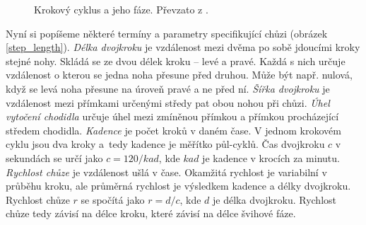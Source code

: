\begin{figure}[h]
\begin{center}
\caption{Krokový cyklus a jeho fáze. Převzato z \cite{gait_img}.} \label{gait_cycle}
\end{center}
\end{figure}

Nyní si popíšeme některé termíny a parametry specifikující chůzi (obrázek \ref{step_length}). \textit{Délka dvojkroku} je vzdálenost mezi dvěma po sobě jdoucími kroky stejné nohy. Skládá se ze dvou délek kroku -- levé a pravé. Každá s nich určuje vzdálenost o kterou se jedna noha přesune před druhou. Může být např. nulová, když se levá noha přesune na úroveň pravé a ne před ní. \textit{Šířka dvojkroku} je vzdálenost mezi přímkami určenými středy pat obou nohou při chůzi. \textit{Úhel vytočení chodidla} určuje úhel mezi zmíněnou přímkou a přímkou procházející středem chodidla. \textit{Kadence} je počet kroků v daném čase. V jednom krokovém cyklu jsou dva kroky a~tedy kadence je měřítko půl-cyklů. Čas dvojkroku $c$ v sekundách se určí jako $c = 120/kad$, kde $kad$ je kadence v krocích za minutu. \textit{Rychlost chůze} je vzdálenost ušlá v čase. Okamžitá rychlost je variabilní v průběhu kroku, ale průměrná rychlost je výsledkem kadence a délky dvojkroku. Rychlost chůze $r$ se spočítá jako $r = d/c$, kde $d$ je délka dvojkroku. Rychlost chůze tedy závisí na délce kroku, které závisí na délce švihové fáze.

